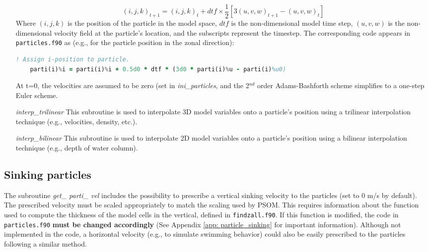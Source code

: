 \documentclass[12pt,letterpaper,titlepage]{article}
\newcommand{\fixme}[1]{\color{red}$<$\textbf{FIX ME: #1}$>$\color{black}}
\begin{document}
\begin{itemize}
	\begin{equation*}
		(i,j,k)_{t+1}= (i,j,k)_{t} + dtf \times \frac{1}{2}[3(u,v,w)_{t+1} - (u,v,w)_{t}]
	\end{equation*}
	Where $(i,j,k)$ is the position of the particle in the model space, $dtf$ is the non-dimensional model time step, $(u,v,w)$ is the non-dimensional velocity field at the particle's location, and the subscripts represent the timestep. The corresponding code appears in \texttt{particles.f90} as (e.g., for the particle position in the zonal direction):
	\begin{lstlisting}[language=fortran]
	! Assign i-position to particle.
	parti(i)%i = parti(i)%i + 0.5d0 * dtf * (3d0 * parti(i)%u - parti(i)%u0)
	\end{lstlisting}
	At t=0, the velocities are assumed to be zero (set in \textit{ini\_particles}, and the 2$^{nd}$ order Adams-Bashforth scheme simplifies to a one-step Euler scheme.
	
	\item[\textit{interp\_trilinear}]	This subroutine is used to interpolate 3D model variables onto a particle's position using a trilinear interpolation technique (e.g., velocities, density, etc.).
	
	\item[\textit{interp\_bilinear}]	This subroutine is used to interpolate 2D model variables onto a particle's position using a bilinear interpolation technique (e.g., depth of water column).
\end{itemize}

\subsection{Sinking particles}

The subroutine \textit{get\_ parti\_ vel} includes the possibility to prescribe a vertical sinking velocity to the particles (set to 0 m/s by default). The prescribed velocity must be scaled appropriately to match the scaling used by PSOM. This requires information about the function used to compute the thickness of the model cells in the vertical, defined in \texttt{findzall.f90}. If this function is modified, the code in \texttt{particles.f90} \textbf{must be changed accordingly} (See Appendix \ref{app: particle_sinking} for important information). %
Although not implemented in the code, a horizontal velocity (e.g., to simulate swimming behavior) could also be easily prescribed to the particles following a similar method.
\end{document}
